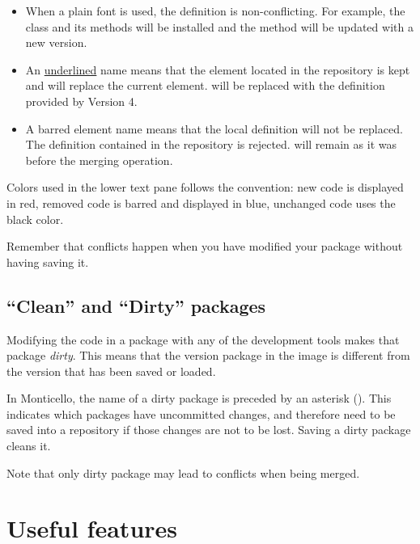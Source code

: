 \documentclass[a4paper,10pt,twoside]{book}
\begin{document}
\begin{itemize}
\item When a plain font is used, the definition is non-conflicting. For example, the class  and its methods will be installed and the method  will be updated with a new version.
\item An \underline{underlined} name means that the element located in the repository is kept and will replace the current element.  will be replaced with the definition provided by Version 4.
\item A barred element name means that the local definition will not be replaced. The definition contained in the repository is rejected.  will remain as it was before the merging operation.
\end{itemize}

Colors used in the lower text pane follows the convention: new code is displayed in red, removed code is barred and displayed in blue, unchanged code uses the black color. 

Remember that conflicts happen when you have modified your package without having saving it.




\subsection{``Clean'' and ``Dirty'' packages}

Modifying the code in a package with any of the development tools makes that package \emph{dirty}.
This means that the version package in the image is different from the version that has been saved or loaded. 

In Monticello, the name of a dirty package is preceded by an asterisk (\ct{*}). This indicates which packages have uncommitted changes, and therefore need to be saved into a repository if those changes are not to be lost. Saving a dirty package cleans it.

Note that only dirty package may lead to conflicts when being merged.

\section{Useful features}
\end{document}
